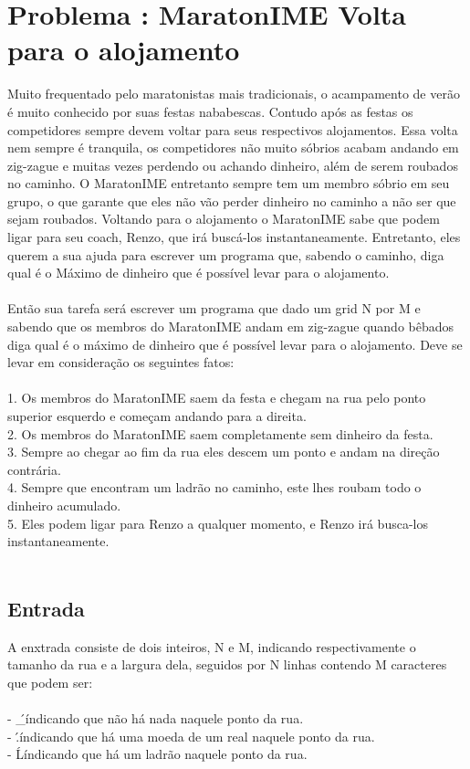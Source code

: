\section*{Problema \proxLetra: MaratonIME Volta para o alojamento}

Muito frequentado pelo maratonistas mais tradicionais, o acampamento de verão é muito conhecido por suas festas nababescas. Contudo após as festas os competidores sempre devem voltar para seus respectivos alojamentos. Essa volta nem sempre é tranquila, os competidores não muito sóbrios acabam andando em zig-zague e muitas vezes perdendo ou achando dinheiro, além de serem roubados no caminho. O MaratonIME entretanto sempre tem um membro sóbrio em seu grupo, o que garante que eles não vão perder dinheiro no caminho a não ser que sejam roubados. Voltando para o alojamento o MaratonIME sabe que podem ligar para seu coach, Renzo, que irá buscá-los instantaneamente. Entretanto, eles querem a sua ajuda para escrever um programa que, sabendo o caminho, diga qual é o Máximo de dinheiro que é possível levar para o alojamento.\\
\\
Então sua tarefa será escrever um programa que dado um grid N por M e sabendo que os membros do MaratonIME andam em zig-zague quando bêbados diga qual é o máximo de dinheiro que é possível levar para o alojamento. Deve se levar em consideração os seguintes fatos:\\
\\
1. Os membros do MaratonIME saem da festa e chegam na rua pelo ponto superior esquerdo e começam andando para a direita.\\
2. Os membros do MaratonIME saem completamente sem dinheiro da festa.\\
3. Sempre ao chegar ao fim da rua eles descem um ponto e andam na direção contrária.\\
4. Sempre que encontram um ladrão no caminho, este lhes roubam todo o dinheiro acumulado.\\
5. Eles podem ligar para Renzo a qualquer momento, e Renzo irá busca-los instantaneamente.\\
\\
\subsection*{Entrada}
\textoDiversasInstanciasEOF

A enxtrada consiste de dois inteiros, N e M, indicando respectivamente o tamanho da rua e a largura dela, seguidos por N linhas contendo M caracteres que podem ser:\\
\\
- \'\_\'  indicando que não há nada naquele ponto da rua.\\
- \'.\'  indicando que há uma moeda de um real naquele ponto da rua.\\
- \'L\'  indicando que há um ladrão naquele ponto da rua.\\

